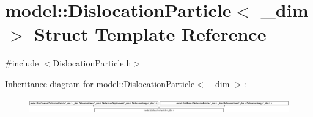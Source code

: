 \hypertarget{structmodel_1_1_dislocation_particle}{}\section{model\+:\+:Dislocation\+Particle$<$ \+\_\+dim $>$ Struct Template Reference}
\label{structmodel_1_1_dislocation_particle}


{\ttfamily \#include $<$Dislocation\+Particle.\+h$>$}

Inheritance diagram for model\+:\+:Dislocation\+Particle$<$ \+\_\+dim $>$\+:\begin{figure}[H]
\begin{center}
\leavevmode
\includegraphics[height=0.654206cm]{structmodel_1_1_dislocation_particle}
\end{center}
\end{figure}

